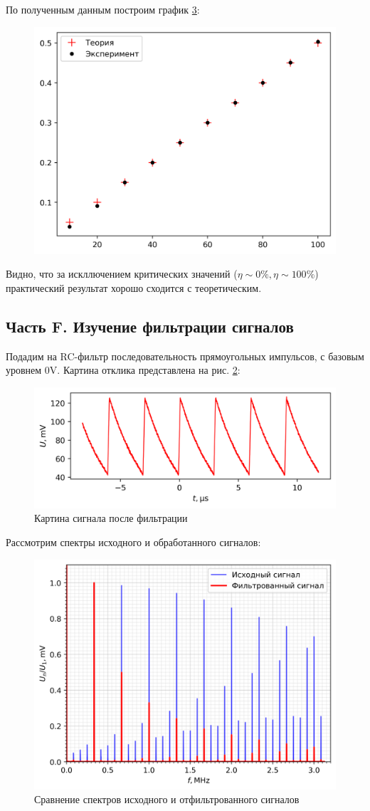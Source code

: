 \documentclass[12pt, a4paper]{article}
\begin{document}
По полученным данным построим график \ref{amplot}:
\begin{figure}[H]
  \centering
  \includegraphics[width=0.6\linewidth]{pics/amplot}
  \caption{}
  \label{ammplot}
\end{figure}
Видно, что за искллючением критических значений ($\eta \sim 0\%, \eta \sim 100 \%$) практический результат хорошо сходится с теоретическим.

\subsection{Часть F. Изучение фильтрации сигналов}
Подадим на RC-фильтр последовательность прямоугольных импульсов, с базовым уровнем 0V. Картина отклика представлена на рис. \ref{RC}:
\begin{figure}[H]
  \includegraphics[width=0.8\linewidth]{pics/RC}
  \caption{Картина сигнала после фильтрации}
  \label{RC}
\end{figure}

Рассмотрим спектры исходного и обработанного сигналов:
\begin{figure}[H]
  \centering
  \includegraphics[width=0.8\linewidth]{pics/RCspec}
  \caption{Сравнение спектров исходного и отфильтрованного сигналов}
  \label{amplot}
\end{figure}
\end{document}
